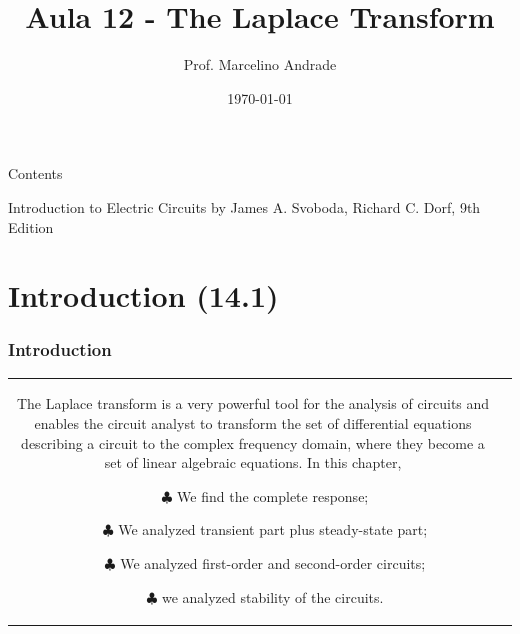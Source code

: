 \documentclass[aspectratio=169]{beamer}
\title[\sc{Teoria de Circuitos Eletrônicos 1}]{\LARGE Aula 12 - The Laplace
Transform}
\author[Prof. Marcelino Andrade]{Prof. Marcelino Andrade}
\institute{Faculdade UnB Gama} %
\date{\today}
\begin{document}
\justifying %
\pagebreak

\begin{frame}
  \titlepage
\end{frame}


\begin{frame}{Contents}

\tableofcontents
     		Introduction to Electric Circuits by James A. Svoboda, Richard C. Dorf, 9th Edition 
\end{frame}

\section{Introduction (14.1)}
\begin{frame}[fragile]
	\frametitle{Introduction}
		\begin{tabular}{cc}
			\begin{columns}
				\begin{column}{1\textwidth}  %
The Laplace transform is a very powerful tool for the analysis of circuits and enables the circuit analyst to transform the set of differential equations describing a circuit
to the complex frequency domain, where they become a set of linear algebraic equations. In this chapter,	
		
\small		\begin{itemize}
						\item[$\clubsuit$]{We find the complete response;\newline}
						\item[$\clubsuit$]{We analyzed transient part plus steady-state part;\newline}
						\item[$\clubsuit$]{We analyzed first-order and second-order circuits;\newline}		
						\item[$\clubsuit$]{we analyzed stability of the circuits.\newline}	
					\end{itemize}
					
				\end{column}
			\end{columns}
		
	\end{tabular}
\end{frame}
\end{document}
